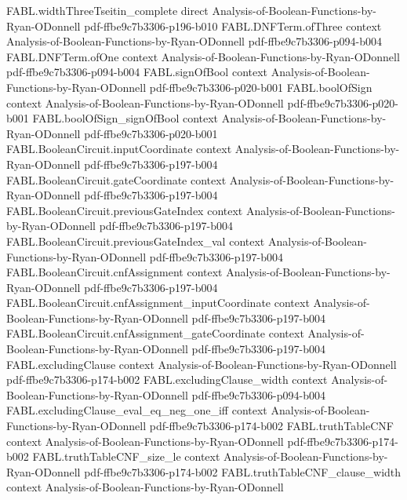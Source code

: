 \begin{theorem}
\proofstep
  {FABL.widthThreeTseitin_complete}
  {direct}
  {Analysis-of-Boolean-Functions-by-Ryan-ODonnell}
  {pdf-ffbe9c7b3306-p196-b010}
\proofstep
  {FABL.DNFTerm.ofThree}
  {context}
  {Analysis-of-Boolean-Functions-by-Ryan-ODonnell}
  {pdf-ffbe9c7b3306-p094-b004}
\proofstep
  {FABL.DNFTerm.ofOne}
  {context}
  {Analysis-of-Boolean-Functions-by-Ryan-ODonnell}
  {pdf-ffbe9c7b3306-p094-b004}
\proofstep
  {FABL.signOfBool}
  {context}
  {Analysis-of-Boolean-Functions-by-Ryan-ODonnell}
  {pdf-ffbe9c7b3306-p020-b001}
\proofstep
  {FABL.boolOfSign}
  {context}
  {Analysis-of-Boolean-Functions-by-Ryan-ODonnell}
  {pdf-ffbe9c7b3306-p020-b001}
\proofstep
  {FABL.boolOfSign_signOfBool}
  {context}
  {Analysis-of-Boolean-Functions-by-Ryan-ODonnell}
  {pdf-ffbe9c7b3306-p020-b001}
\proofstep
  {FABL.BooleanCircuit.inputCoordinate}
  {context}
  {Analysis-of-Boolean-Functions-by-Ryan-ODonnell}
  {pdf-ffbe9c7b3306-p197-b004}
\proofstep
  {FABL.BooleanCircuit.gateCoordinate}
  {context}
  {Analysis-of-Boolean-Functions-by-Ryan-ODonnell}
  {pdf-ffbe9c7b3306-p197-b004}
\proofstep
  {FABL.BooleanCircuit.previousGateIndex}
  {context}
  {Analysis-of-Boolean-Functions-by-Ryan-ODonnell}
  {pdf-ffbe9c7b3306-p197-b004}
\proofstep
  {FABL.BooleanCircuit.previousGateIndex_val}
  {context}
  {Analysis-of-Boolean-Functions-by-Ryan-ODonnell}
  {pdf-ffbe9c7b3306-p197-b004}
\proofstep
  {FABL.BooleanCircuit.cnfAssignment}
  {context}
  {Analysis-of-Boolean-Functions-by-Ryan-ODonnell}
  {pdf-ffbe9c7b3306-p197-b004}
\proofstep
  {FABL.BooleanCircuit.cnfAssignment_inputCoordinate}
  {context}
  {Analysis-of-Boolean-Functions-by-Ryan-ODonnell}
  {pdf-ffbe9c7b3306-p197-b004}
\proofstep
  {FABL.BooleanCircuit.cnfAssignment_gateCoordinate}
  {context}
  {Analysis-of-Boolean-Functions-by-Ryan-ODonnell}
  {pdf-ffbe9c7b3306-p197-b004}
\proofstep
  {FABL.excludingClause}
  {context}
  {Analysis-of-Boolean-Functions-by-Ryan-ODonnell}
  {pdf-ffbe9c7b3306-p174-b002}
\proofstep
  {FABL.excludingClause_width}
  {context}
  {Analysis-of-Boolean-Functions-by-Ryan-ODonnell}
  {pdf-ffbe9c7b3306-p094-b004}
\proofstep
  {FABL.excludingClause_eval_eq_neg_one_iff}
  {context}
  {Analysis-of-Boolean-Functions-by-Ryan-ODonnell}
  {pdf-ffbe9c7b3306-p174-b002}
\proofstep
  {FABL.truthTableCNF}
  {context}
  {Analysis-of-Boolean-Functions-by-Ryan-ODonnell}
  {pdf-ffbe9c7b3306-p174-b002}
\proofstep
  {FABL.truthTableCNF_size_le}
  {context}
  {Analysis-of-Boolean-Functions-by-Ryan-ODonnell}
  {pdf-ffbe9c7b3306-p174-b002}
\proofstep
  {FABL.truthTableCNF_clause_width}
  {context}
  {Analysis-of-Boolean-Functions-by-Ryan-ODonnell}

\end{theorem}
